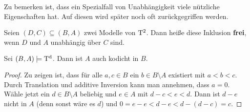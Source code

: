 Zu bemerken ist, dass ein Spezialfall von Unabhängigkeit viele nützliche Eigenschaften hat. Auf diesen wird später noch oft zurückgegriffen werden.
\begin{definition}
	Seien $(D,C)\subseteq(B,A)$ zwei Modelle von $\operatorname{T^2}$. Dann heiße diese Inklusion \textbf{frei}, wenn $D$ und $A$ unabhängig über $C$ sind.
\end{definition}

\begin{lemma}\label{Kodichte von A}
	Sei $(B,A)\models\operatorname{T^d}$. Dann ist $A$ auch kodicht in $B$.
\end{lemma}
\begin{proof}
	Zu zeigen ist, dass für alle $a,c\in B$ ein $b\in B\setminus A$ existiert mit $a<b<c$. Durch Translation und additive Inversion kann man annehmen, dass $a=0$. Wähle jetzt ein $d\in B\setminus A$ beliebig und $e\in A$ mit $d-c<e<d$. Dann ist $d-e$ nicht in $A$ (denn sonst wäre es $d$) und $0=e-e<d-e<d-(d-c)=c$.
\end{proof}

